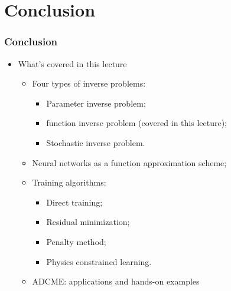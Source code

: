 \documentclass{beamer}
\begin{document}
\section{Conclusion}


\begin{frame}
	\frametitle{Conclusion}
	\begin{itemize}
		\item What's covered in this lecture
		\begin{itemize}
		\item Four types of inverse problems: 
		\begin{itemize}
			\item Parameter inverse problem;
			\item function inverse problem (covered in this lecture);
			\item Stochastic inverse problem.
		\end{itemize}
		\item Neural networks as a function approximation scheme;
		\item Training algorithms:
		\begin{itemize}
		\item Direct training;
		\item Residual minimization;
		\item Penalty method;
		\item Physics constrained learning.
		\end{itemize}
		\item ADCME: applications and hands-on examples
		\end{itemize}
	\end{itemize}
\end{frame}
\end{document}

